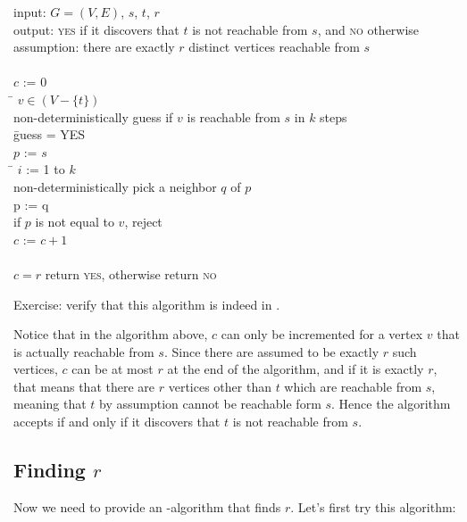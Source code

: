\begin{program}
input: $G = (V,E)$, $s$, $t$, $r$ \\
output: \textsc{yes} if it discovers that $t$ is not reachable from $s$, and \textsc{no} otherwise \\
assumption: there are exactly $r$ distinct vertices reachable from $s$ \\
\\
$c$ := 0 \\
\FORALL \= $v \in (V - \{t\})$ \DO \\
        \> non-deterministically guess if $v$ is reachable from $s$ in $k$ steps \\
        \> \IF \= guess = YES \THEN \\
	\>     \> $p$ := $s$ \\
    	\>     \> \FOR \= $i$ := 1 to $k$ \DO \\
        \>     \>      \> non-deterministically pick a neighbor $q$ of $p$ \\
        \>     \>      \> p := q \\
        \>     \> if $p$ is not equal to $v$, reject \\
        \>     \> $c$ := $c + 1$ \\
\\
\IF $c = r$ \THEN return \textsc{yes}, otherwise return \textsc{no} \\
\end{program}
Exercise: verify that this algorithm is indeed in \nl.

Notice that in the algorithm above, $c$ can only be incremented for a
vertex $v$ that is actually reachable from $s$.  Since there are
assumed to be exactly $r$ such vertices, $c$ can be at most $r$ at the
end of the algorithm, and if it is exactly $r$, that means that there
are $r$ vertices other than $t$ which are reachable from $s$, meaning
that $t$ by assumption cannot be reachable form $s$.  Hence the
algorithm accepts if and only if it discovers that $t$ is not
reachable from $s$.

\subsection{Finding $r$}

Now we need to provide an \nl-algorithm that finds $r$.  Let's first try this algorithm:

